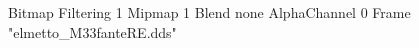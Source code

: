 {Bitmap
	{Filtering 1}
	{Mipmap 1}
	{Blend none}
	{AlphaChannel 0}
	{Frame "elmetto_M33fanteRE.dds"}
}

